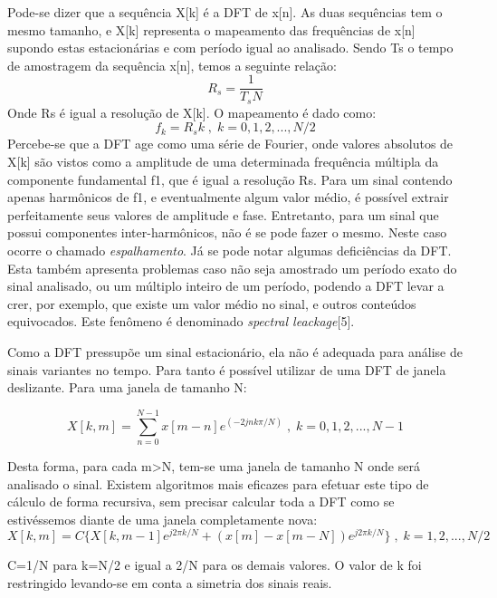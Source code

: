 Pode-se dizer que a sequência X[k] é a DFT de x[n]. As duas sequências tem o mesmo tamanho, e X[k] representa o mapeamento das frequências de x[n] supondo estas estacionárias e com período igual ao analisado. Sendo Ts o tempo de amostragem da sequência x[n], temos a seguinte relação:
\begin{equation}
R_s=\frac{1}{T_sN}
\end{equation}
\indent Onde Rs é igual a resolução de X[k]. O mapeamento é dado como:
\begin{equation}
f_k=R_s k\;,\;k=0, 1, 2,...,N/2
\end{equation}
\indent Percebe-se que a DFT age como uma série de Fourier, onde valores absolutos de X[k] são vistos como a amplitude de uma determinada frequência múltipla da componente fundamental f1, que é igual a resolução Rs. Para um sinal contendo apenas harmônicos de f1, e eventualmente algum valor médio, é possível extrair perfeitamente seus valores de amplitude e fase. Entretanto, para um sinal que possui componentes inter-harmônicos, não é se pode fazer o mesmo. Neste caso ocorre o chamado \textit{espalhamento}. Já se pode notar algumas deficiências da DFT. Esta também apresenta problemas caso não seja amostrado um período exato do sinal analisado, ou um múltiplo inteiro de um período, podendo a DFT levar a crer, por exemplo, que existe um valor médio no sinal, e outros conteúdos equivocados. Este fenômeno é denominado \textit{spectral leackage}[5]. 

\indent Como a DFT pressupõe um sinal estacionário, ela não é adequada para análise de sinais variantes no tempo. Para tanto é possível utilizar de uma DFT de janela deslizante. Para uma janela de tamanho N:

\begin{equation}
X[k,m]=\sum_{n=0}^{N-1} x[m-n]e^{(-2jnk\pi/N)}\;,\;k=0,1,2,...,N-1
\end{equation}

\indent Desta forma, para cada m>N, tem-se uma janela de tamanho N onde será analisado o sinal. Existem algoritmos mais eficazes para efetuar este tipo de cálculo de forma recursiva, sem precisar calcular toda a DFT como se estivéssemos diante de uma janela completamente nova:
\begin{equation}
X[k,m]=C\{X[k,m-1]e^{j2\pi k/N}+(x[m]-x[m-N])e^{j2\pi k/N}\}\;,\;k=1,2,...,N/2
\label{eq:dft recursiva}
\end{equation}

\indent C=1/N para k=N/2 e igual a 2/N para os demais valores. O valor de k foi restringido levando-se em conta a simetria dos sinais reais.

